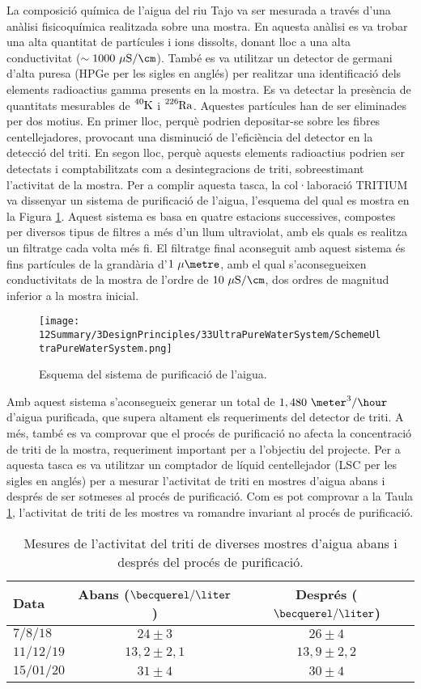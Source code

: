 La composició química de l'aigua del riu Tajo va ser mesurada a través d'una anàlisi fisicoquímica realitzada sobre una mostra. En aquesta anàlisi es va trobar una alta quantitat de partícules i ions dissolts, donant lloc a una alta conductivitat ($\sim 1000~\mu\text{S}/\cm$). També es va utilitzar un detector de germani d'alta puresa (HPGe per les sigles en anglés) per realitzar una identificació dels elements radioactius gamma presents en la mostra. Es va detectar la presència de quantitats mesurables de $\ce{^{40}K}$ i $\ce{^{226}Ra}$. Aquestes partícules han de ser eliminades per dos motius. En primer lloc, perquè podrien depositar-se sobre les fibres centellejadores, provocant una disminució de l'eficiència del detector en la detecció del triti. En segon lloc, perquè aquests elements radioactius podrien ser detectats i comptabilitzats com a desintegracions de triti, sobreestimant l'activitat de la mostra. Per a complir aquesta tasca, la col·laboració TRITIUM va dissenyar un sistema de purificació de l'aigua, l'esquema del qual es mostra en la Figura \ref{fig:EsquemaSistemaAiguaUltrapura}. Aquest sistema es basa en quatre estacions successives, compostes per diversos tipus de filtres a més d'un llum ultraviolat, amb els quals es realitza un filtratge cada volta més fi. El filtratge final aconseguit amb aquest sistema és fins partícules de la grandària d'$1~\mu\metre$, amb el qual s'aconsegueixen conductivitats de la mostra de l'ordre de $10~\mu\text{S}/\cm$, dos ordres de magnitud inferior a la mostra inicial.
\begin{figure}[htbp]
\centering
\texttt{[image: 12Summary/3DesignPrinciples/33UltraPureWaterSystem/SchemeUltraPureWaterSystem.png]}
\caption{Esquema del sistema de purificació de l'aigua.\label{fig:EsquemaSistemaAiguaUltrapura}}
\end{figure}
Amb aquest sistema s'aconsegueix generar un total de $1,480~\meter^3/\hour$ d'aigua purificada, que supera altament els requeriments del detector de triti. A més, també es va comprovar que el procés de purificació no afecta la concentració de triti de la mostra, requeriment important per a l'objectiu del projecte. Per a aquesta tasca es va utilitzar un comptador de líquid centellejador (LSC per les sigles en anglés) per a mesurar l'activitat de triti en mostres d'aigua abans i després de ser sotmeses al procés de purificació. Com es pot comprovar a la Taula \ref{tab:ValorsActivitatTriti}, l'activitat de triti de les mostres va romandre invariant al procés de purificació.

\begin{table}[htbp]
\centering{}%
\begin{tabular}{lcc}
\toprule 
Data & Abans ($\becquerel/\liter$) & Després ($\becquerel/\liter$) \tabularnewline
\midrule
\midrule 
$7/8/18$ & $24 \pm 3$ & $26 \pm 4$ \tabularnewline
$11/12/19$ & $13,2 \pm 2,1$ & $13,9 \pm 2,2$ \tabularnewline
$15/01/20$ & $31 \pm 4$ & $30 \pm 4$ \tabularnewline
\bottomrule
\end{tabular}
\caption{Mesures de l'activitat del triti de diverses mostres d'aigua abans i després del procés de purificació.}
\label{tab:ValorsActivitatTriti}
\end{table}

